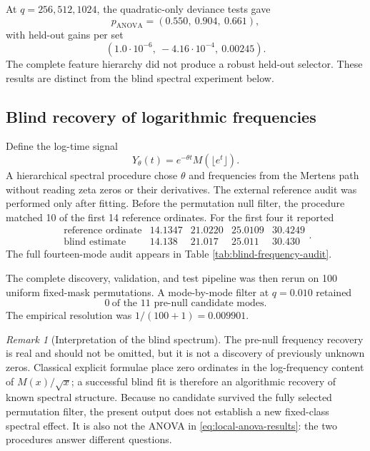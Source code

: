 \documentclass[11pt,reqno]{amsart}
\numberwithin{equation}{section}
\theoremstyle{plain}
\theoremstyle{definition}
\theoremstyle{remark}
\newtheorem{remark}[theorem]{Remark}
\begin{document}
At \(q=256,512,1024\), the quadratic-only deviance tests gave
\begin{equation}
p_{\mathrm{ANOVA}}=(0.550,\ 0.904,\ 0.661),
\label{eq:local-anova-results}
\end{equation}
with held-out gains per set
\begin{equation}
(1.0\cdot10^{-6},\ -4.16\cdot10^{-4},\ 0.00245).
\label{eq:local-anova-test-gains}
\end{equation}
The complete feature hierarchy did not produce a robust held-out selector.
These results are distinct from the blind spectral experiment below.

\subsection{Blind recovery of logarithmic frequencies}
\label{subsec:blind-spectral-recovery}

Define the log-time signal
\begin{equation}
Y_{\theta}(t)=e^{-\theta t}M(\lfloor e^t\rfloor).
\label{eq:blind-log-signal}
\end{equation}
A hierarchical spectral procedure chose \(\theta\) and frequencies from the
Mertens path without reading zeta zeros or their derivatives.  The external
reference audit was performed only after fitting.  Before the permutation
null filter, the procedure matched 10 of the first 14 reference ordinates.
For the first four it reported
\begin{equation}
\begin{array}{c|rrrr}
\text{reference ordinate}&14.1347&21.0220&25.0109&30.4249\\ \hline
\text{blind estimate}&14.138&21.017&25.011&30.430
\end{array}.
\label{eq:first-four-blind-frequencies}
\end{equation}
The full fourteen-mode audit appears in Table
\ref{tab:blind-frequency-audit}.

The complete discovery, validation, and test pipeline was then rerun on 100
uniform fixed-mask permutations.  A mode-by-mode filter at
\(q=0.010\) retained
\begin{equation}
0\ \text{of the 11 pre-null candidate modes}.
\label{eq:blind-null-filter-result}
\end{equation}
The empirical resolution was \(1/(100+1)=0.009901\).

\begin{remark}[Interpretation of the blind spectrum]
\label{rem:blind-spectrum-interpretation}
The pre-null frequency recovery is real and should not be omitted, but it is
not a discovery of previously unknown zeros.  Classical explicit formulae
place zero ordinates in the log-frequency content of \(M(x)/\sqrt x\); a
successful blind fit is therefore an algorithmic recovery of known spectral
structure.  Because no candidate survived the fully selected permutation
filter, the present output does not establish a new fixed-class spectral
effect.  It is also not the ANOVA in
\eqref{eq:local-anova-results}: the two procedures answer different
questions.
\end{remark}
\end{document}
